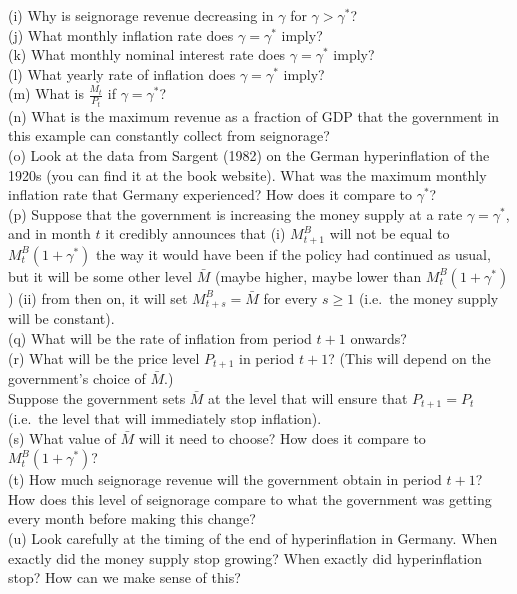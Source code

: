 \documentclass[12pt, letterpaper]{article}
\newcommand{\MBase}{M^{B}}
\begin{document}
\begin{tcolorbox}[evenbox,title={Problem 11.6 \quad Seignorage with High Inflation}]
\begin{tcolorbox}[questionbox,title={\textit{Question (continued)}}]
(i) Why is seignorage revenue decreasing in $\gamma$ for $\gamma>\gamma^\ast$?\\
(j) What monthly inflation rate does $\gamma=\gamma^\ast$ imply?\\
(k) What monthly nominal interest rate does $\gamma=\gamma^\ast$ imply?\\
(l) What yearly rate of inflation does $\gamma=\gamma^\ast$ imply?\\
(m) What is $\frac{M_t}{P_t}$ if $\gamma=\gamma^\ast$?\\
(n) What is the maximum revenue as a fraction of GDP that the government in this example can
constantly collect from seignorage?\\
(o) Look at the data from Sargent (1982) on the German hyperinflation of the 1920s (you can find
it at the book website). What was the maximum monthly inflation rate that Germany experienced?
How does it compare to $\gamma^\ast$?\\
(p) Suppose that the government is increasing the money supply at a rate $\gamma=\gamma^\ast$, and in
month $t$ it credibly announces that (i) $\MBase_{t+1}$ will not be equal to $\MBase_t(1+\gamma^\ast)$ the
way it would have been if the policy had continued as usual, but it will be some other level
$\bar M$ (maybe higher, maybe lower than $\MBase_t(1+\gamma^\ast)$) (ii) from then on, it will set
$\MBase_{t+s}=\bar M$ for every $s\ge1$ (i.e.\ the money supply will be constant).\\
(q) What will be the rate of inflation from period $t+1$ onwards?\\
(r) What will be the price level $P_{t+1}$ in period $t+1$? (This will depend on the government's
choice of $\bar M$.)\\
Suppose the government sets $\bar M$ at the level that will ensure that $P_{t+1}=P_t$ (i.e.\ the
level that will immediately stop inflation).\\
(s) What value of $\bar M$ will it need to choose? How does it compare to $\MBase_t(1+\gamma^\ast)$?\\
(t) How much seignorage revenue will the government obtain in period $t+1$? How does this level
of seignorage compare to what the government was getting every month before making this change?\\
(u) Look carefully at the timing of the end of hyperinflation in Germany. When exactly did the
money supply stop growing? When exactly did hyperinflation stop? How can we make sense of this?
\end{tcolorbox}


\end{tcolorbox}
\end{document}
